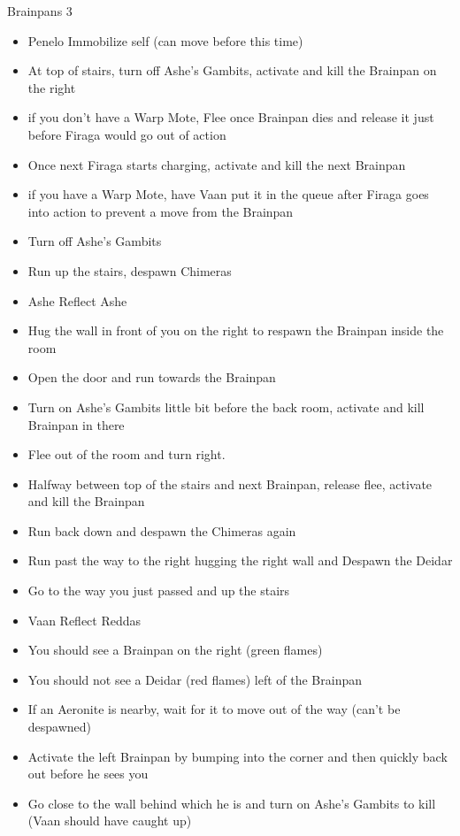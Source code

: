 \begin{battle}{Brainpans 3}
	\begin{itemize}
		\item  Penelo Immobilize self (can move before this time)
		\item  At top of stairs, turn off Ashe's Gambits, activate and kill the Brainpan on the right
		\item  if you don't have a Warp Mote, Flee once Brainpan dies and release it just before Firaga would go out of action
		\item  Once next Firaga starts charging, activate and kill the next Brainpan
		\item  if you have a Warp Mote, have Vaan put it in the queue after Firaga goes into action to prevent a move from the Brainpan
		\item  Turn off Ashe's Gambits
		\item  Run up the stairs, despawn Chimeras
		\item  Ashe Reflect Ashe
		\item  Hug the wall in front of you on the right to respawn the Brainpan inside the room
		\item  Open the door and run towards the Brainpan
		\item  Turn on Ashe's Gambits little bit before the back room, activate and kill Brainpan in there
		\item  Flee out of the room and turn right.
		\item  Halfway between top of the stairs and next Brainpan, release flee, activate and kill the Brainpan
		\item  Run back down and despawn the Chimeras again
		\item  Run past the way to the right hugging the right wall and Despawn the Deidar
		\item  Go to the way you just passed and up the stairs
		\item  Vaan Reflect Reddas
		\item  You should see a Brainpan on the right (green flames)
		\item  You should not see a Deidar (red flames) left of the Brainpan
		\item  If an Aeronite is nearby, wait for it to move out of the way (can't be despawned)
		\item  Activate the left Brainpan by bumping into the corner and then quickly back out before he sees you
		\item  Go close to the wall behind which he is and turn on Ashe's Gambits to kill (Vaan should have caught up)

\end{itemize}
\end{battle}
